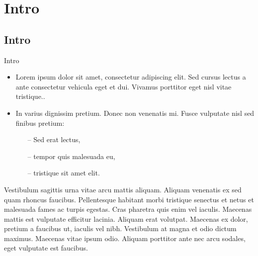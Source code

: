 \section[Intro]{Intro}

\subsection[Intro]{Intro}

\begin{frame}
	
	\begin{block}{Intro}
		\begin{itemize}
				\item Lorem ipsum dolor sit amet, consectetur adipiscing elit. Sed cursus lectus a ante consectetur vehicula eget et dui. Vivamus porttitor eget nisl vitae tristique..
				\item In varius dignissim pretium. Donec non venenatis mi. Fusce vulputate nisl sed finibus pretium:
					\begin{itemize}
						\item[--] Sed erat lectus,
						\item[--] tempor quis malesuada eu, 
						\item[--] tristique sit amet elit.
					\end{itemize}
			\end{itemize}
		Vestibulum sagittis urna vitae arcu mattis aliquam. Aliquam venenatis ex sed quam rhoncus faucibus. Pellentesque habitant morbi tristique senectus et netus et malesuada fames ac turpis egestas. Cras pharetra quis enim vel iaculis. Maecenas mattis est vulputate efficitur lacinia. Aliquam erat volutpat. Maecenas ex dolor, pretium a faucibus ut, iaculis vel nibh. Vestibulum at magna et odio dictum maximus. Maecenas vitae ipsum odio. Aliquam porttitor ante nec arcu sodales, eget vulputate est faucibus.
	\end{block}
\end{frame}